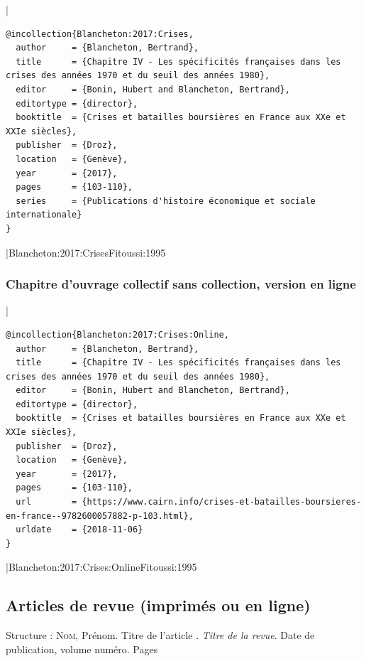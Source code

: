 \documentclass{article}
\begin{document}
|
\begin{verbatim}
@incollection{Blancheton:2017:Crises,
  author     = {Blancheton, Bertrand},
  title      = {Chapitre IV - Les spécificités françaises dans les crises des années 1970 et du seuil des années 1980},
  editor     = {Bonin, Hubert and Blancheton, Bertrand},
  editortype = {director},
  booktitle  = {Crises et batailles boursières en France aux XXe et XXIe siècles},
  publisher  = {Droz},
  location   = {Genève},
  year       = {2017},
  pages      = {103-110},
  series     = {Publications d'histoire économique et sociale internationale}
}
\end{verbatim}
|{Blancheton:2017:Crises}{Fitoussi:1995}

\subsubsection{Chapitre d'ouvrage collectif sans collection, version en ligne}

|
\begin{verbatim}
@incollection{Blancheton:2017:Crises:Online,
  author     = {Blancheton, Bertrand},
  title      = {Chapitre IV - Les spécificités françaises dans les crises des années 1970 et du seuil des années 1980},
  editor     = {Bonin, Hubert and Blancheton, Bertrand},
  editortype = {director},
  booktitle  = {Crises et batailles boursières en France aux XXe et XXIe siècles},
  publisher  = {Droz},
  location   = {Genève},
  year       = {2017},
  pages      = {103-110},
  url        = {https://www.cairn.info/crises-et-batailles-boursieres-en-france--9782600057882-p-103.html},
  urldate    = {2018-11-06}
}
\end{verbatim}
|{Blancheton:2017:Crises:Online}{Fitoussi:1995}

\subsection{Articles de revue (imprimés ou en ligne)}

Structure : \textsc{Nom}, Prénom. \og Titre de l'article \fg{}. \textit{Titre de la revue}. Date de publication, volume numéro. Pages
\end{document}
